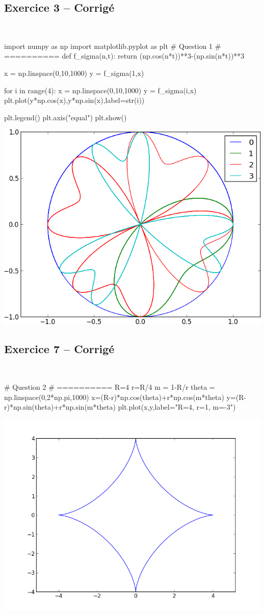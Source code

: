 \documentclass[10pt,fleqn]{article} %
\begin{document}
\subsection*{Exercice 3 -- Corrigé}

\begin{corrige}
$\quad$
\begin{python}
import numpy as np
import matplotlib.pyplot as plt
# Question 1 
# ==========
def f_sigma(n,t):
    return (np.cos(n*t))**3-(np.sin(n*t))**3

x = np.linspace(0,10,1000)
y = f_sigma(1,x)

for i in range(4):
    x = np.linspace(0,10,1000)
    y = f_sigma(i,x)
    plt.plot(y*np.cos(x),y*np.sin(x),label=str(i))

plt.legend()
plt.axis("equal")    
plt.show()
\end{python}
\end{corrige}
\begin{center}
\includegraphics[width=.4\linewidth]{images/exo_FB_03}
\end{center}

\subsection*{Exercice 7 -- Corrigé}

\begin{corrige}
$\quad$
\begin{python}
# Question 2
# ==========
R=4
r=R/4
m = 1-R/r
theta = np.linspace(0,2*np.pi,1000)
x=(R-r)*np.cos(theta)+r*np.cos(m*theta)
y=(R-r)*np.sin(theta)+r*np.sin(m*theta)
plt.plot(x,y,label="R=4, r=1, m=-3")
\end{python}
\end{corrige}

\begin{center}
\includegraphics[width=.4\linewidth]{images/exo_FB_07_1}
\end{center}
\end{document}

